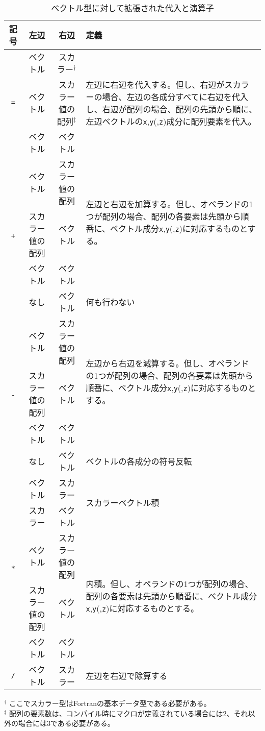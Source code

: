 \begin{table}[H]
\begin{tabularx}{\linewidth}{|c|c|c|X|}
\toprule
\rowcolor{Snow2}
記号 & 左辺 & 右辺 & 定義 \\
\midrule
\multirow{3}{*}{\texttt{=}} & ベクトル & スカラー$^{\dagger}$ & \multirow{3}{\hsize}{\footnotesize 左辺に右辺を代入する。但し、右辺がスカラーの場合、左辺の各成分すべてに右辺を代入し、右辺が配列の場合、配列の先頭から順に、左辺ベクトルの\texttt{x},\texttt{y}(,\texttt{z})成分に配列要素を代入。} \\
\cmidrule(r){2-3}
 & ベクトル & スカラー値の配列$^{\ddagger}$ &  \\
\cmidrule(r){2-3}
 & ベクトル & ベクトル &  \\
\midrule
\multirow{4}{*}{\texttt{+}} & ベクトル & スカラー値の配列 & \multirow{3}{\hsize}{\footnotesize 左辺と右辺を加算する。但し、オペランドの1つが配列の場合、配列の各要素は先頭から順番に、ベクトル成分\texttt{x},\texttt{y}(,\texttt{z})に対応するものとする。} \\
\cmidrule(r){2-3}
 & スカラー値の配列 & ベクトル & \\
\cmidrule(r){2-3}
 & ベクトル & ベクトル & \\
\cmidrule(r){2-4}
 & なし & ベクトル & 何も行わない \\
\midrule
\multirow{4}{*}{\texttt{-}} & ベクトル & スカラー値の配列 & \multirow{3}{\hsize}{\footnotesize 左辺から右辺を減算する。但し、オペランドの1つが配列の場合、配列の各要素は先頭から順番に、ベクトル成分\texttt{x},\texttt{y}(,\texttt{z})に対応するものとする。} \\
\cmidrule(r){2-3}
& スカラー値の配列 & ベクトル &  \\
\cmidrule(r){2-3}
& ベクトル & ベクトル & \\
\cmidrule(r){2-4}
& なし & ベクトル & ベクトルの各成分の符号反転 \\
\midrule
\multirow{5}{*}{\texttt{*}} & ベクトル & スカラー & \multirow{2}{*}{スカラーベクトル積} \\
\cmidrule(r){2-3}
 & スカラー & ベクトル & \\
\cmidrule(r){2-4}
 & ベクトル & スカラー値の配列 & \multirow{3}{\hsize}{\footnotesize 内積。但し、オペランドの1つが配列の場合、配列の各要素は先頭から順番に、ベクトル成分\texttt{x},\texttt{y}(,\texttt{z})に対応するものとする。} \\
\cmidrule(r){2-3}
 & スカラー値の配列 & ベクトル &  \\
\cmidrule(r){2-3}
 & ベクトル & ベクトル &  \\
\midrule
\texttt{/} & ベクトル & スカラー & 左辺を右辺で除算する \\
\bottomrule
\end{tabularx}
\begin{flushleft}
$^{\dagger}$ ここでスカラー型はFortranの基本データ型である必要がある。\\
$^{\ddagger}$ 配列の要素数は、コンパイル時にマクロが定義されている場合には2、それ以外の場合には3である必要がある。
\end{flushleft}
\caption{ベクトル型に対して拡張された代入と演算子}
\label{tbl:op_ext:fdps_vector}
\end{table}
